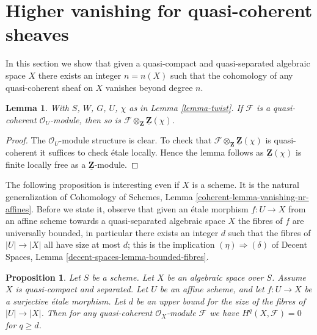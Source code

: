 \documentclass{stacks-project}
\theoremstyle{plain}
\newtheorem{proposition}[subsection]{Proposition}
\newtheorem{lemma}[subsection]{Lemma}
\theoremstyle{definition}
\theoremstyle{remark}
\numberwithin{equation}{subsection}
\begin{document}
\section{Higher vanishing for quasi-coherent sheaves}
\label{section-higher-vanishing}

\noindent
In this section we show that given a quasi-compact and
quasi-separated algebraic space $X$ there exists an integer
$n = n(X)$ such that the cohomology of any quasi-coherent
sheaf on $X$ vanishes beyond degree $n$.

\begin{lemma}
\label{lemma-quasi-coherent-twist}
With $S$, $W$, $G$, $U$, $\chi$ as in
Lemma \ref{lemma-twist}.
If $\mathcal{F}$ is a quasi-coherent $\mathcal{O}_U$-module,
then so is $\mathcal{F} \otimes_{\mathbf{Z}} \underline{\mathbf{Z}}(\chi)$.
\end{lemma}

\begin{proof}
The $\mathcal{O}_U$-module structure is clear. To check that
$\mathcal{F} \otimes_{\mathbf{Z}} \underline{\mathbf{Z}}(\chi)$
is quasi-coherent it suffices to check \'etale locally.
Hence the lemma follows as $\underline{\mathbf{Z}}(\chi)$
is finite locally free as a $\underline{\mathbf{Z}}$-module.
\end{proof}

\noindent
The following proposition is interesting even if $X$ is a scheme.
It is the natural generalization of
Cohomology of Schemes, Lemma \ref{coherent-lemma-vanishing-nr-affines}.
Before we state it, observe that given an \'etale morphism
$f : U \to X$ from an affine scheme towards a quasi-separated algebraic
space $X$ the fibres of $f$ are universally bounded, in particular
there exists an integer $d$ such that the fibres of $|U| \to |X|$
all have size at most $d$; this is the implication
$(\eta) \Rightarrow (\delta)$ of
Decent Spaces, Lemma \ref{decent-spaces-lemma-bounded-fibres}.

\begin{proposition}
\label{proposition-vanishing}
Let $S$ be a scheme. Let $X$ be an algebraic space over $S$.
Assume $X$ is quasi-compact and separated.
Let $U$ be an affine scheme, and let
$f : U \to X$ be a surjective \'etale morphism.
Let $d$ be an upper bound for the size of the fibres of
$|U| \to |X|$. Then for any quasi-coherent $\mathcal{O}_X$-module $\mathcal{F}$
we have $H^q(X, \mathcal{F}) = 0$ for $q \geq d$.
\end{proposition}
\end{document}
